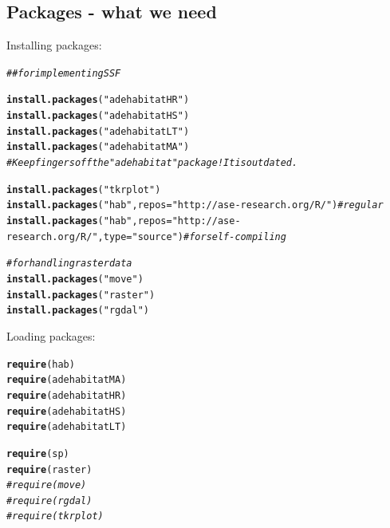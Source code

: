 \documentclass[11pt, a4paper]{article}\usepackage[]{graphicx}\usepackage[]{color}
\makeatletter
\newcommand{\hlstr}[1]{\textcolor[rgb]{0.192,0.494,0.8}{#1}}%
\newcommand{\hlcom}[1]{\textcolor[rgb]{0.678,0.584,0.686}{\textit{#1}}}%
\newcommand{\hlstd}[1]{\textcolor[rgb]{0.345,0.345,0.345}{#1}}%
\newcommand{\hlkwc}[1]{\textcolor[rgb]{0.333,0.667,0.333}{#1}}%
\newcommand{\hlkwd}[1]{\textcolor[rgb]{0.737,0.353,0.396}{\textbf{#1}}}%
\newenvironment{kframe}{%
 \def\at@end@of@kframe{}%
 \ifinner\ifhmode%
  \def\at@end@of@kframe{\end{minipage}}%
  \begin{minipage}{\columnwidth}%
 \fi\fi%
 \def\FrameCommand##1{\hskip\@totalleftmargin \hskip-\fboxsep
 \colorbox{shadecolor}{##1}\hskip-\fboxsep
     \hskip-\linewidth \hskip-\@totalleftmargin \hskip\columnwidth}%
 \MakeFramed {\advance\hsize-\width
   \@totalleftmargin\z@ \linewidth\hsize
   \@setminipage}}%
 {\par\unskip\endMakeFramed%
 \at@end@of@kframe}
\newenvironment{knitrout}{}{} %
\makeatother
\begin{document}
\subsection{Packages - what we need}

Installing packages:
\begin{knitrout}
\color{fgcolor}\begin{kframe}
\begin{alltt}
\hlcom{## for implementing SSF}

\hlkwd{install.packages}\hlstd{(}\hlstr{"adehabitatHR"}\hlstd{)}
\hlkwd{install.packages}\hlstd{(}\hlstr{"adehabitatHS"}\hlstd{)}
\hlkwd{install.packages}\hlstd{(}\hlstr{"adehabitatLT"}\hlstd{)}
\hlkwd{install.packages}\hlstd{(}\hlstr{"adehabitatMA"}\hlstd{)}
\hlcom{# Keep fingers off the "adehabitat" package! It is outdated.}

\hlkwd{install.packages}\hlstd{(}\hlstr{"tkrplot"}\hlstd{)}
\hlkwd{install.packages}\hlstd{(}\hlstr{"hab"}\hlstd{,} \hlkwc{repos} \hlstd{=} \hlstr{"http://ase-research.org/R/"}\hlstd{)} \hlcom{# regular}
\hlkwd{install.packages}\hlstd{(}\hlstr{"hab"}\hlstd{,} \hlkwc{repos} \hlstd{=} \hlstr{"http://ase-research.org/R/"}\hlstd{,} \hlkwc{type} \hlstd{=} \hlstr{"source"}\hlstd{)} \hlcom{# for self-compiling}

\hlcom{# for handling raster data}
\hlkwd{install.packages}\hlstd{(}\hlstr{"move"}\hlstd{)}
\hlkwd{install.packages}\hlstd{(}\hlstr{"raster"}\hlstd{)}
\hlkwd{install.packages}\hlstd{(}\hlstr{"rgdal"}\hlstd{)}
\end{alltt}
\end{kframe}
\end{knitrout}

Loading packages:

\begin{knitrout}
\color{fgcolor}\begin{kframe}
\begin{alltt}
\hlkwd{require}\hlstd{(hab)}
\hlkwd{require}\hlstd{(adehabitatMA)}
\hlkwd{require}\hlstd{(adehabitatHR)}
\hlkwd{require}\hlstd{(adehabitatHS)}
\hlkwd{require}\hlstd{(adehabitatLT)}

\hlkwd{require}\hlstd{(sp)}
\hlkwd{require}\hlstd{(raster)}
\hlcom{#require(move)}
\hlcom{#require(rgdal)}
\hlcom{#require(tkrplot)}
\end{alltt}
\end{kframe}
\end{knitrout}
\end{document}
